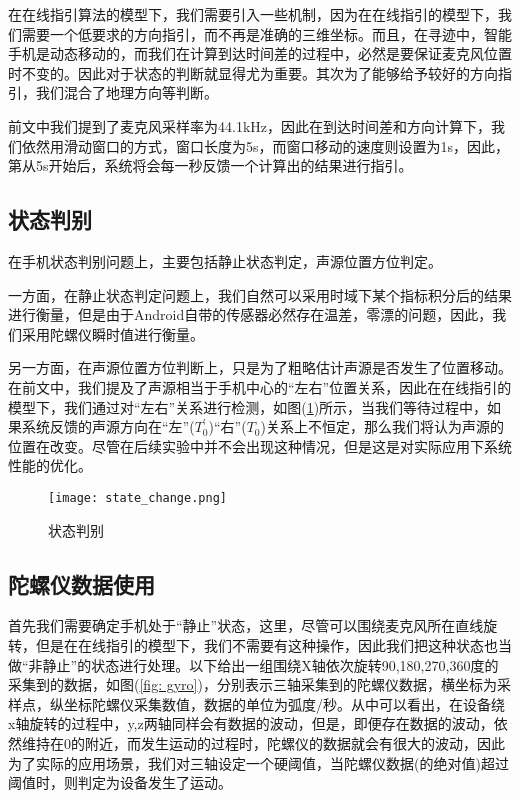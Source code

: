 \documentclass[winfonts,oneside]{njuthesis}
\begin{document}
			在在线指引算法的模型下，我们需要引入一些机制，因为在在线指引的模型下，我们需要一个低要求的方向指引，而不再是准确的三维坐标。而且，在寻迹中，智能手机是动态移动的，而我们在计算到达时间差的过程中，必然是要保证麦克风位置时不变的。因此对于状态的判断就显得尤为重要。其次为了能够给予较好的方向指引，我们混合了地理方向等判断。
			
			前文中我们提到了麦克风采样率为44.1kHz，因此在到达时间差和方向计算下，我们依然用滑动窗口的方式，窗口长度为5s，而窗口移动的速度则设置为1s，因此，第从5s开始后，系统将会每一秒反馈一个计算出的结果进行指引。
			
		\subsection{状态判别}
		
			在手机状态判别问题上，主要包括静止状态判定，声源位置方位判定。
			
			一方面，在静止状态判定问题上，我们自然可以采用时域下某个指标积分后的结果进行衡量，但是由于Android自带的传感器必然存在温差，零漂的问题，因此，我们采用陀螺仪瞬时值进行衡量。
			
			另一方面，在声源位置方位判断上，只是为了粗略估计声源是否发生了位置移动。在前文中，我们提及了声源相当于手机中心的“左右”位置关系，因此在在线指引的模型下，我们通过对“左右”关系进行检测，如图(\ref{fig: state-change})所示，当我们等待过程中，如果系统反馈的声源方向在“左”($T_0^{'}$)“右”($T_0$)关系上不恒定，那么我们将认为声源的位置在改变。尽管在后续实验中并不会出现这种情况，但是这是对实际应用下系统性能的优化。
			
			\begin{figure}[H]
				\centering
				\texttt{[image: state\_change.png]} 
				\caption{{状态判别}}
				\label{fig: state-change}
			\end{figure}	
						
		\subsection{陀螺仪数据使用}	
		
			首先我们需要确定手机处于“静止”状态，这里，尽管可以围绕麦克风所在直线旋转，但是在在线指引的模型下，我们不需要有这种操作，因此我们把这种状态也当做“非静止”的状态进行处理。以下给出一组围绕X轴依次旋转90,180,270,360度的采集到的数据，如图(\ref{fig: gyro})，分别表示三轴采集到的陀螺仪数据，横坐标为采样点，纵坐标陀螺仪采集数值，数据的单位为弧度/秒。从中可以看出，在设备绕x轴旋转的过程中，y,z两轴同样会有数据的波动，但是，即便存在数据的波动，依然维持在0的附近，而发生运动的过程时，陀螺仪的数据就会有很大的波动，因此为了实际的应用场景，我们对三轴设定一个硬阈值，当陀螺仪数据(的绝对值)超过阈值时，则判定为设备发生了运动。
		
\end{document}
